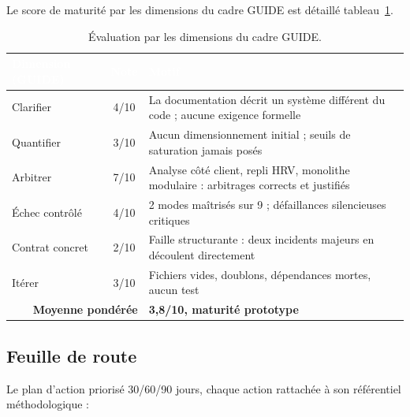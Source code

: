 \documentclass[11pt,a4paper]{article}
\begin{document}
Le score de maturité par les dimensions du cadre GUIDE \cite{systemdesignskills} est détaillé
tableau~\ref{tab:guide}.

\begin{table}[H]
\centering\small
\begin{tabularx}{\linewidth}{p{4.1cm} c X}
\toprule
\rowcolor{cwblue} \textcolor{white}{\bf Dimension (GUIDE)} & \textcolor{white}{\bf Note} & \textcolor{white}{\bf Motif} \\
\midrule
Clarifier & 4/10 & La documentation décrit un système différent du code ; aucune exigence formelle \\
Quantifier & 3/10 & Aucun dimensionnement initial ; seuils de saturation jamais posés \\
Arbitrer & 7/10 & Analyse côté client, repli HRV, monolithe modulaire : arbitrages corrects et justifiés \\
Échec contrôlé & 4/10 & 2 modes maîtrisés sur 9 ; défaillances silencieuses critiques \\
Contrat concret & 2/10 & Faille structurante : deux incidents majeurs en découlent directement \\
Itérer & 3/10 & Fichiers vides, doublons, dépendances mortes, aucun test \\
\midrule
\multicolumn{2}{r}{\textbf{Moyenne pondérée}} & \textbf{3,8/10, maturité prototype} \\
\bottomrule
\end{tabularx}
\caption{Évaluation par les dimensions du cadre GUIDE.}
\label{tab:guide}
\end{table}

\subsection{Feuille de route}
Le plan d'action priorisé 30/60/90 jours, chaque action rattachée à son référentiel méthodologique :
\end{document}
